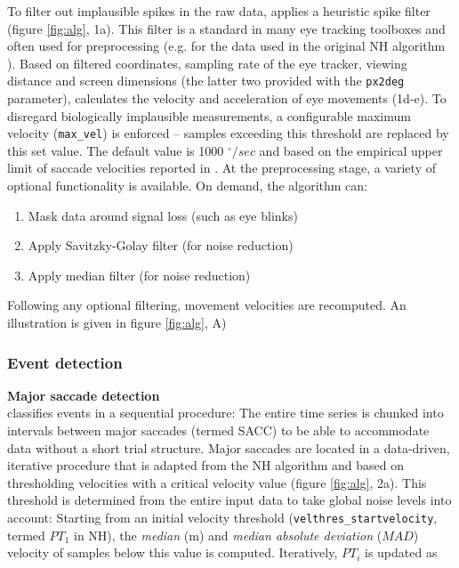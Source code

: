 To filter out implausible spikes in the raw data, \remodnav applies a heuristic
spike filter \citep{stampe1993} (figure \ref{fig:alg}, 1a). This filter is a
standard in many eye tracking toolboxes and often used for preprocessing (e.g.
for the data used in the original NH algorithm \citep{Friedman2018}). Based on
filtered coordinates, sampling rate of the eye tracker, viewing distance and
screen dimensions (the latter two provided with the \texttt{px2deg} parameter),
\remodnav calculates the velocity and acceleration of eye movements (1d-e). To
disregard biologically implausible measurements, a configurable maximum
velocity (\texttt{max\_vel}) is enforced -- samples exceeding this threshold
are replaced by this set value. The default value is 1000 $^\circ/sec$ and
based on the empirical upper limit of saccade velocities reported in
\cite{holmqvist2011eye}.  At the preprocessing stage, a variety of optional
functionality is available. On demand, the algorithm can:
%
\begin{enumerate}
\item Mask data around signal loss (such as eye blinks)
\item Apply Savitzky-Golay filter (for noise reduction)
\item Apply median filter (for noise reduction)
\end{enumerate}
%
Following any optional filtering, movement velocities are recomputed. An
illustration is given in figure \ref{fig:alg}, A)


\subsubsection*{Event detection}

\textbf{Major saccade detection}\\
%
\remodnav classifies events in a sequential procedure: The entire time series
is chunked into intervals between major saccades (termed SACC) to be able to
accommodate data without a short trial structure. Major saccades are located in
a data-driven, iterative procedure that is adapted from the NH algorithm and
based on thresholding velocities with a critical velocity value (figure
\ref{fig:alg}, 2a). This threshold is determined from the entire input data to
take global noise levels into account: Starting from an initial velocity
threshold (\texttt{velthres\_\linebreak[0]startvelocity}, termed $PT_1$ in NH),
the \textit{median} (m) and \textit{median absolute deviation} ($MAD$) velocity
of samples below this value is computed. Iteratively, $PT_i$ is updated as


